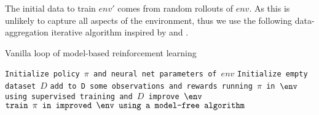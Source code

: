 % 

The initial data to train $env'$ comes from random rollouts of $env$. As this is unlikely to capture all aspects of the environment, thus we use the following data-aggregation iterative algorithm inspired by \cite[Section 4]{trpo_ensemble} and \cite[Section 5]{world_models}.


 

\begin{algorithm}[H]
\caption{Vanilla loop of model-based reinforcement learning}\label{dpll}
\begin{algorithmic}[1]
\State \texttt{Initialize policy $\pi$ and neural net parameters of $env$}	
\State \texttt{Initialize empty dataset $D$}	
\Repeat 
\State \texttt{add to D some observations and rewards running $\pi$ in $\env$}
\State \texttt{using supervised training and $D$ improve $\env$ }
\State $\texttt{train $\pi$ in improved $\env$ using a model-free algorithm}$
\end{algorithmic}
\label{basic_loop}
\label{alg:basic_loop}
\end{algorithm}
 


